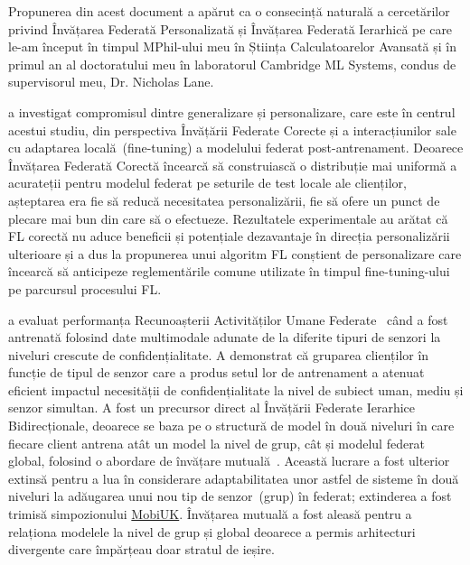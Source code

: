 Propunerea din acest document a apărut ca o consecință naturală a cercetărilor privind Învățarea Federată Personalizată și Învățarea Federată Ierarhică pe care le-am început în timpul MPhil-ului meu în Știința Calculatoarelor Avansată și în primul an al doctoratului meu în laboratorul Cambridge ML Systems, condus de supervisorul meu, Dr. Nicholas Lane.

\citet{EuroMLSysWorkshop} a investigat compromisul dintre generalizare și personalizare, care este în centrul acestui studiu, din perspectiva Învățării Federate Corecte și a interacțiunilor sale cu adaptarea locală~(fine-tuning) a modelului federat post-antrenament. Deoarece Învățarea Federată Corectă încearcă să construiască o distribuție mai uniformă a acurateții pentru modelul federat pe seturile de test locale ale clienților, așteptarea era fie să reducă necesitatea personalizării, fie să ofere un punct de plecare mai bun din care să o efectueze. Rezultatele experimentale au arătat că FL corectă nu aduce beneficii și potențiale dezavantaje în direcția personalizării ulterioare și a dus la propunerea unui algoritm FL conștient de personalizare care încearcă să anticipeze reglementările comune utilizate în timpul fine-tuning-ului pe parcursul procesului FL.

\citet{OperaWorkshop} a evaluat performanța Recunoașterii Activităților Umane Federate~\citep{HARusingFL_2018} când a fost antrenată folosind date multimodale adunate de la diferite tipuri de senzori la niveluri crescute de confidențialitate. A demonstrat că gruparea clienților în funcție de tipul de senzor care a produs setul lor de antrenament a atenuat eficient impactul necesității de confidențialitate la nivel de subiect uman, mediu și senzor simultan. A fost un precursor direct al Învățării Federate Ierarhice Bidirecționale, deoarece se baza pe o structură de model în două niveluri în care fiecare client antrena atât un model la nivel de grup, cât și modelul federat global, folosind o abordare de învățare mutuală~\citep{DeepMutualLearning}. Această lucrare a fost ulterior extinsă pentru a lua în considerare adaptabilitatea unor astfel de sisteme în două niveluri la adăugarea unui nou tip de senzor~(grup) în federat; extinderea a fost trimisă simpozionului \href{https://mobiuk.org/2023}{MobiUK}. Învățarea mutuală a fost aleasă pentru a relaționa modelele la nivel de grup și global deoarece a permis arhitecturi divergente care împărțeau doar stratul de ieșire.